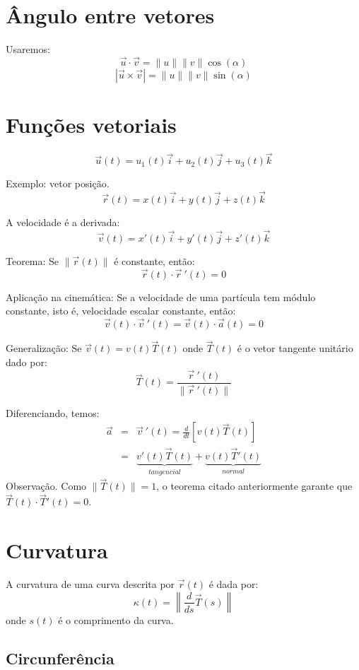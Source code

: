 \documentclass[a4paper,10pt]{article}
\begin{document}
\section{Ângulo entre vetores}

Usaremos:
$$\vec{u}\cdot\vec{v} = \|u\|\|v\|\cos(\alpha)$$
$$|\vec{u}\times\vec{v}| = \|u\|\|v\|\sin(\alpha)$$


\section{Funções vetoriais}

$$\vec{u}(t) = u_1(t)\vec{i}+u_2(t)\vec{j}+u_3(t)\vec{k}$$

Exemplo: vetor posição.
$$\vec{r}(t) = x(t)\vec{i}+y(t)\vec{j}+z(t)\vec{k}$$

A velocidade é a derivada:
$$\vec{v}(t) = x'(t)\vec{i}+y'(t)\vec{j}+z'(t)\vec{k}$$

Teorema:
Se $\|\vec{r}(t)\|$ é constante, então:
$$\vec{r}(t)\cdot \vec{r}\!~'(t)=0$$


Aplicação na cinemática:
Se a velocidade de uma partícula tem módulo constante, isto é, velocidade escalar constante, então:
$$\vec{v}(t)\cdot \vec{v}\!~'(t)=\vec{v}(t)\cdot \vec{a}(t)=0$$

Generalização:
Se $\vec{v}(t)=v(t)\vec{T}(t)$
onde $\vec{T}(t)$ é o vetor tangente unitário dado por:
$$\vec{T}(t) = \frac{\vec{r}~\!'(t)}{\|\vec{r}~\!'(t)\|} $$

Diferenciando, temos:
\begin{eqnarray*}
 \vec{a}&=&\vec{v}~\!'(t)=\frac{d}{dt}\left[v(t)\vec{T}(t)\right]\\
 &=&\underbrace{v'(t)\vec{T}(t)}_{tangencial}+\underbrace{v(t)\vec{T}'(t)}_{normal}
\end{eqnarray*}
Observação. Como $\|\vec{T}(t)\|=1$, o teorema citado anteriormente garante que $\vec{T}(t)\cdot\vec{T}'(t)=0$.

\section{Curvatura}
A curvatura de uma curva descrita por $\vec{r}(t)$ é dada por:
$$\kappa(t) = \left\|\frac{d}{ds}\vec{T}(s)\right\|$$
onde $s(t)$ é o comprimento da curva.

\subsection{Circunferência}
\end{document}
